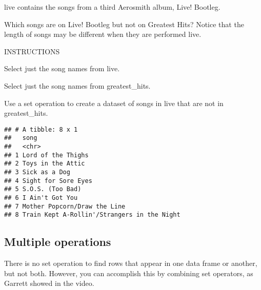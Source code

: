 \documentclass[]{article}
\newenvironment{Shaded}{\begin{snugshade}}{\end{snugshade}}
\newcommand{\KeywordTok}[1]{\textcolor[rgb]{0.13,0.29,0.53}{\textbf{#1}}}
\newcommand{\StringTok}[1]{\textcolor[rgb]{0.31,0.60,0.02}{#1}}
\newcommand{\CommentTok}[1]{\textcolor[rgb]{0.56,0.35,0.01}{\textit{#1}}}
\newcommand{\OperatorTok}[1]{\textcolor[rgb]{0.81,0.36,0.00}{\textbf{#1}}}
\newcommand{\NormalTok}[1]{#1}
\begin{document}
live contains the songs from a third Aerosmith album, Live! Bootleg.

Which songs are on Live! Bootleg but not on Greatest Hits? Notice that
the length of songs may be different when they are performed live.

INSTRUCTIONS

Select just the song names from live.

Select just the song names from greatest\_hits.

Use a set operation to create a dataset of songs in live that are not in
greatest\_hits.

\begin{Shaded}
\end{Shaded}

\begin{verbatim}
## # A tibble: 8 x 1
##   song                                       
##   <chr>                                      
## 1 Lord of the Thighs                         
## 2 Toys in the Attic                          
## 3 Sick as a Dog                              
## 4 Sight for Sore Eyes                        
## 5 S.O.S. (Too Bad)                           
## 6 I Ain't Got You                            
## 7 Mother Popcorn/Draw the Line               
## 8 Train Kept A-Rollin'/Strangers in the Night
\end{verbatim}

\subsection{Multiple operations}\label{multiple-operations}

There is no set operation to find rows that appear in one data frame or
another, but not both. However, you can accomplish this by combining set
operators, as Garrett showed in the video.
\end{document}
